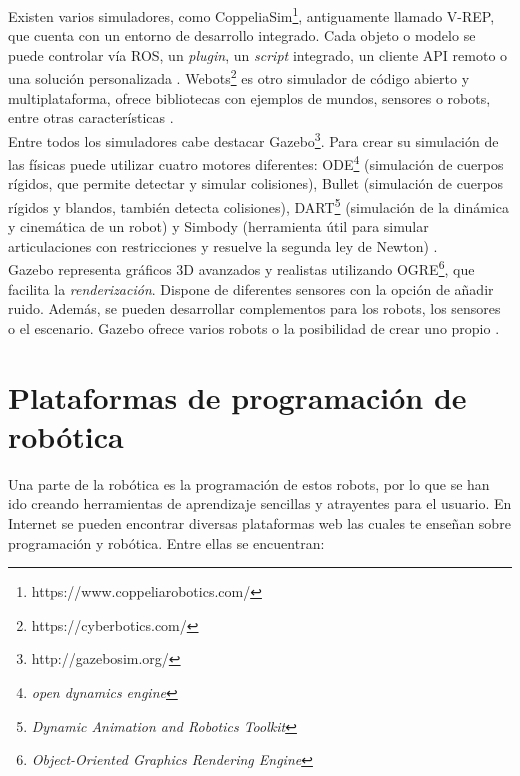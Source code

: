 Existen varios simuladores, como CoppeliaSim\footnote{https://www.coppeliarobotics.com/}, antiguamente llamado V-REP, que cuenta con un entorno de desarrollo integrado. Cada objeto o modelo se puede controlar vía ROS, un \textit{plugin}, un \textit{script} integrado, un cliente API remoto o una solución personalizada \cite{sim}.  Webots\footnote{https://cyberbotics.com/} es otro simulador de código abierto y multiplataforma, ofrece bibliotecas con ejemplos de mundos, sensores o robots, entre otras características \cite{körber2021comparing}.\\

Entre todos los simuladores cabe destacar Gazebo\footnote{http://gazebosim.org/}. Para crear su simulación de las físicas puede utilizar cuatro motores diferentes: ODE\footnote{\textit{open dynamics engine}} (simulación de cuerpos rígidos, que permite detectar y simular colisiones), Bullet (simulación de cuerpos rígidos y blandos, también detecta colisiones), DART\footnote{\textit{Dynamic Animation and Robotics Toolkit}} (simulación de la dinámica y cinemática de un robot) y Simbody (herramienta útil para simular articulaciones con restricciones y resuelve la segunda ley de Newton) \cite{upm56724}.\\

Gazebo representa gráficos 3D avanzados y realistas utilizando OGRE\footnote{\textit{Object-Oriented Graphics Rendering Engine}}, que facilita la \textit{renderización}. Dispone de diferentes sensores con la opción de añadir ruido. Además, se pueden desarrollar complementos para los robots, los sensores o el escenario. Gazebo ofrece varios robots o la posibilidad de crear uno propio \cite{gaz}.
\newpage
\section{Plataformas de programación de robótica}
Una parte de la robótica es la programación de estos robots, por lo que se han ido creando herramientas de aprendizaje sencillas y atrayentes para el usuario. En Internet se pueden encontrar diversas plataformas web las cuales te enseñan sobre programación y robótica. Entre ellas se encuentran:

